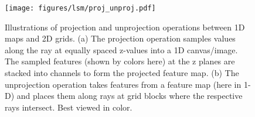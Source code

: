 \begin{figure}
\texttt{[image: figures/lsm/proj\_unproj.pdf]}
\caption{Illustrations of projection and unprojection operations between 1D maps and 2D grids. (a) The projection operation samples values along the ray at equally spaced z-values into a 1D canvas/image. The sampled features (shown by colors here) at the z planes are stacked into channels to form the projected feature map. (b) The unprojection operation takes features from a feature map (here in 1-D) and places them along rays at grid blocks where the respective rays intersect. Best viewed in color.}
\end{figure}